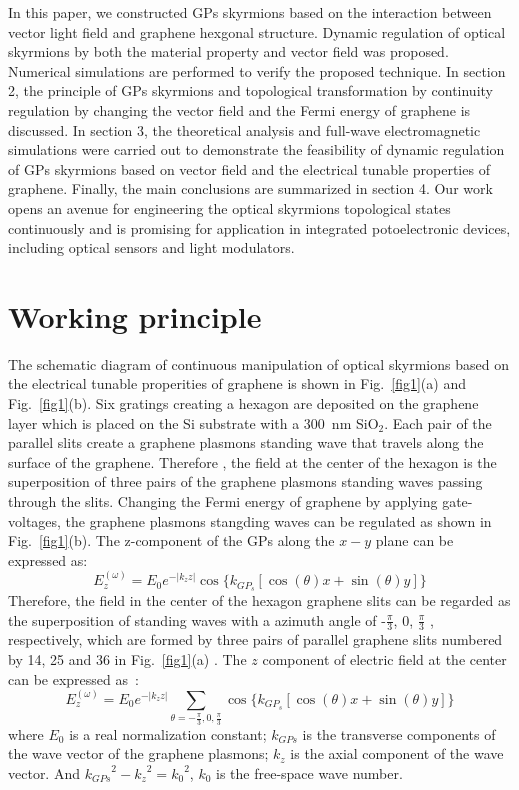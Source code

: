 \documentclass{optica-article}
\begin{document}
In this paper, we constructed GPs skyrmions based on the interaction between vector light field and graphene hexgonal structure. Dynamic regulation of optical skyrmions by both the material property and vector field was proposed. Numerical simulations are performed to verify the proposed technique. In section 2, the principle of GPs skyrmions and topological transformation by continuity regulation by changing the vector field and the Fermi energy of graphene is discussed. In section 3, the theoretical analysis and full-wave electromagnetic simulations were carried out to demonstrate the feasibility of dynamic regulation of GPs skyrmions based on vector field and the electrical tunable properties of graphene. Finally, the main conclusions are summarized in section 4. Our work opens an avenue for engineering the optical skyrmions topological states continuously and is promising for application in integrated potoelectronic devices, including optical sensors and light modulators. 

\section{Working principle}

The schematic diagram of continuous manipulation of optical skyrmions based on the electrical tunable properities of graphene is shown in Fig.~\ref{fig1}(a) and Fig.~\ref{fig1}(b). Six gratings creating a hexagon are deposited on the graphene layer which is placed on the Si substrate with a 300~nm SiO$_{2}$. Each pair of the parallel slits create a graphene plasmons standing wave that travels along the surface of the graphene. Therefore , the field at the center of the hexagon is the superposition of three pairs of the graphene plasmons standing waves passing through the slits. Changing the Fermi energy of graphene by applying gate-voltages, the graphene plasmons stangding waves can be regulated as shown in Fig.~\ref{fig1}(b). The z-component of the GPs along the $x-y$ plane can be expressed as: 
\begin{equation}
E_{z}^{(\omega)}=E_{0}e^{-{\left|{k_{z}z}\right|}}{\cos\{k_{GP_{s}}[\cos{(\theta)x}+\sin{(\theta)}y]\}}
\label{eqn1}
\end{equation}
Therefore, the field in the center of the hexagon graphene slits can be regarded as the superposition of standing waves with a azimuth angle of -$\frac{\pi}{3}$, $0$, $\frac{\pi}{3}$ , respectively, which are formed by three pairs of parallel graphene slits numbered by 14, 25 and 36 in Fig.~\ref{fig1}(a) . The $z$ component of electric field at the center can be expressed as~\cite{tsesses2018optical11}:
\begin{equation}
E_{z}^{(\omega)}=E_{0}e^{-{\left|{k_{z}z}\right|}}{\sum_{\theta=-{\frac{\pi}{3}},{0},{\frac{\pi}{3}}}}{\cos\{k_{GP_{s}}[\cos{(\theta)x}+\sin{(\theta)}y]\}} 
\label{eqn2}
\end{equation}
where $E_{0}$ is a real normalization constant; $k_{GPs}$ is the transverse components of the wave vector of the graphene plasmons; $k_{z}$ is the axial component of the wave vector. And ${k_{GPs}}^{2}-{k_{z}}^{2}={k_{0}}^{2}$, $k_{0}$ is the free-space wave number.
\end{document}
